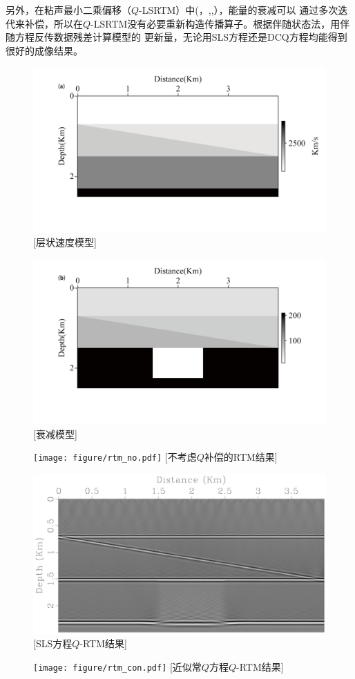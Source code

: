 另外，在粘声最小二乘偏移（$Q$-LSRTM）中(，,,），能量的衰减可以
通过多次迭代来补偿，所以在$Q$-LSRTM没有必要重新构造传播算子。根据伴随状态法，用伴随方程反传数据残差计算模型的
更新量，无论用SLS方程还是DCQ方程均能得到很好的成像结果。
\begin{figure}[!htbp]
	    \centering
		\includegraphics[width=0.9\linewidth]{figure/lens_v.pdf}
		[层状速度模型]
		\label{fig:lens_v}
\end{figure}
\begin{figure}[!htbp]
	    \centering
		\includegraphics[width=0.9\linewidth]{figure/lens_q.pdf}
		\label{fig:lens_q}
\end{figure}
\begin{figure}[!htbp]
	    \centering
		\texttt{[image: figure/rtm\_no.pdf]}
		[不考虑$Q$补偿的RTM结果]
		\label{fig:rtm_no}
\end{figure}
\begin{figure}[!htbp]
	    \centering
		\includegraphics[width=0.6\linewidth]{figure/rtm_sls}
		[SLS方程$Q$-RTM结果]
		\label{fig:rtm_sls}
\end{figure}
\begin{figure}[!htbp]
	    \centering
		\texttt{[image: figure/rtm\_con.pdf]}
		[近似常$Q$方程$Q$-RTM结果]
		\label{fig:rtm_con}
\end{figure}
